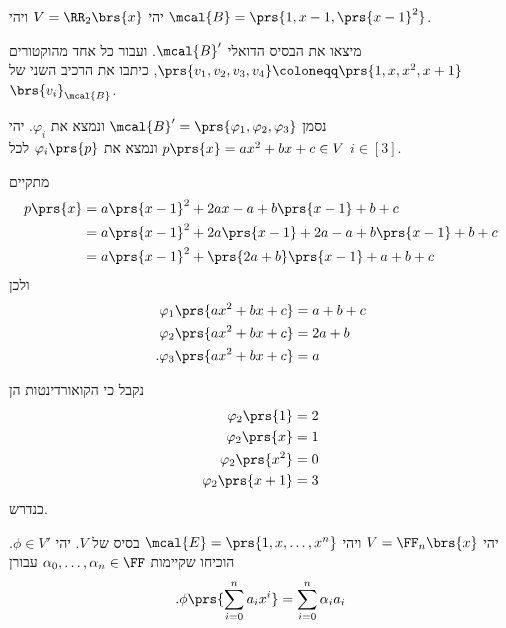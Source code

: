 \documentclass[a4paper,10pt,twoside,openany]{book}
\begin{document}
\begin{exercisechap}
יהי
$V = \RR_2\brs{x}$
ויהי
$\mcal{B} = \prs{1, x-1, \prs{x-1}^2}$.

 מיצאו את הבסיס הדואלי
$\mcal{B}'$.
ועבור כל אחד מהוקטורים
$\prs{v_1, v_2, v_3, v_4} \coloneqq \prs{1, x, x^2, x+1}$,
כיתבו את הרכיב השני של
$\brs{v_i}_{\mcal{B}}$.
\end{exercisechap}

\begin{solution}
נסמן
$\mcal{B}' = \prs{\varphi_1, \varphi_2, \varphi_3}$
ונמצא את
$\varphi_i$.
יהי
$p\prs{x} = ax^2 + bx + c \in V$
ונמצא את
$\varphi_i\prs{p}$
לכל
$i \in [3]$.

מתקיים
\begin{align*}
p\prs{x} &= a \prs{x-1}^2 + 2ax - a + b\prs{x-1} + b + c
\\&= a\prs{x-1}^2 + 2a\prs{x-1} + 2a - a + b\prs{x-1} + b + c
\\&= a \prs{x-1}^2 + \prs{2a + b}\prs{x-1} + a + b + c
\end{align*}
ולכן
\begin{align*}
\varphi_1\prs{ax^2 + bx + c} &= a+b+c \\
\varphi_2\prs{ax^2 + bx + c} &= 2a+b \\
\text{.} \varphi_3\prs{ax^2 + bx + c} &= a
\end{align*}

נקבל כי הקואורדינטות הן
\begin{align*}
\varphi_2\prs{1} &= 2 \\
\varphi_2\prs{x} &= 1 \\
\varphi_2\prs{x^2} &= 0 \\
\varphi_2\prs{x+1} &= 3 
\end{align*}
כנדרש.
\end{solution}

\begin{exercisechap}
יהי
$V = \FF_n\brs{x}$
ויהי
$\mcal{E} = \prs{1, x, \ldots, x^n}$
בסיס של
$V$.
יהי
$\phi \in V'$.
הוכיחו שקיימות
$\alpha_0, \ldots, \alpha_n \in \FF$
עבורן
\[\text{.} \phi\prs{\sum_{i=0}^n a_i x^i} = \sum_{i=0}^n \alpha_i a_i\]
\end{exercisechap}
\end{document}
